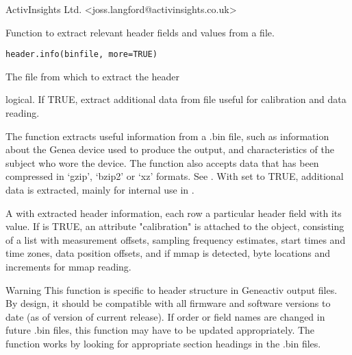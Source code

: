 \documentclass[a4paper]{book}
\begin{document}
%
\begin{Author}\relax
ActivInsights Ltd. <joss.langford@activinsights.co.uk>
\end{Author}
%
\begin{Description}\relax
Function to extract relevant header fields and values from a file.
\end{Description}
%
\begin{Usage}
\begin{verbatim}
header.info(binfile, more=TRUE)
\end{verbatim}
\end{Usage}
%
\begin{Arguments}
\begin{ldescription}
\item[\code{binfile}] The file from which to extract the header
\item[\code{more}] logical. If TRUE, extract additional data from file useful for calibration and data reading.
\end{ldescription}
\end{Arguments}
%
\begin{Details}\relax
The function extracts useful information from a .bin file, such as information about the Genea device used to produce the output, and characteristics of the subject who wore the device. The function also accepts data that has been compressed in `gzip', `bzip2' or `xz' formats. See .
With  set to TRUE, additional data is extracted, mainly for internal use in .
\end{Details}
%
\begin{Value}
A  with extracted header information, each row a particular header field with its value. 
If  is TRUE, an attribute "calibration" is attached to the object, consisting of a list with measurement offsets, sampling frequency estimates, start times and time zones, data position offsets, and if mmap is detected, byte locations and increments for mmap reading.
\end{Value}
%
\begin{Section}{Warning}
This function is specific to header structure in Geneactiv output files. By design, it should be compatible with all firmware and software versions to date (as of version of current release). If order or field names are changed in future .bin files, this function may have to be updated appropriately.
The function works by looking for appropriate section headings in the .bin files.
\end{Section}
\end{document}
